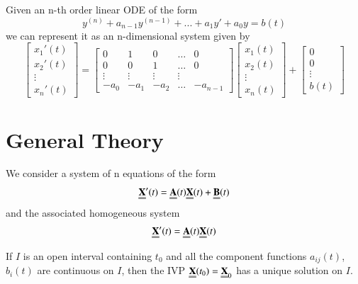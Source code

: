 \documentclass[12pt, a4paper, oneside, openright, titlepage]{book}
\begin{document}
\begin{obs}
        Given an n-th order linear ODE of the form $$y^{(n)}+a_{n-1}y^{(n-1)}+...+a_1y'+a_0y=b(t)$$ we can represent it as an n-dimensional system given by \begin{equation}
                \begin{bmatrix}x_1'(t) \\ x_2'(t) \\ \vdots \\ x_n'(t) \end{bmatrix} = \begin{bmatrix} 0 & 1 & 0 & \hdots & 0 \\ 0 & 0 & 1 & \hdots & 0 \\ \vdots & \vdots & \vdots & \vdots \\ -a_0 & -a_1 & -a_2 & \hdots & -a_{n-1} \end{bmatrix}\begin{bmatrix}x_1(t) \\ x_2(t) \\ \vdots \\ x_n(t) \end{bmatrix}+\begin{bmatrix}0 \\ 0 \\ \vdots \\ b(t) \end{bmatrix}
        \end{equation}
\end{obs}



\section{General Theory}


We consider a system of n equations of the form \begin{equation}
        \Emph{X}'(t) = \Emph{A}(t)\Emph{X}(t)+\Emph{B}(t) 
\end{equation}
and the associated homogeneous system \begin{equation}
        \Emph{X}'(t) = \Emph{A}(t)\Emph{X}(t) 
\end{equation}



\begin{thm}
        If $I$ is an open interval containing $t_0$ and all the component functions $a_{ij}(t)$, $b_i(t)$ are continuous on $I$, then the IVP $\Emph{X}(t_0) = \Emph{X}_0$ has a unique solution on $I$.
\end{thm}
\end{document}
